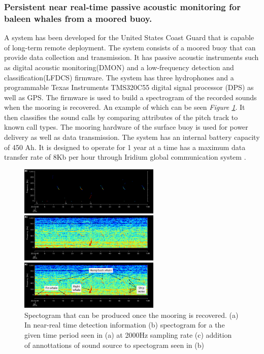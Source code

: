 
\subsubsection{Persistent near real‐time passive acoustic monitoring for baleen whales from a moored buoy.}
A system has been developed for the United States Coast Guard that is capable of long-term remote deployment. 
The system consists of a moored buoy that can provide data collection and transmission.
It has passive acoustic instruments such as digital acoustic monitoring(DMON) and a low-frequency detection and classification(LFDCS) firmware.
The system has three hydrophones and a programmable Texas Instruments TMS320C55 digital signal processor (DPS) as well as GPS.
The firmware is used to build a spectrogram of the recorded sounds when the mooring is recovered.
An example of which can be seen \textit{Figure \ref{fig:SpectoExamp}}.
It then classifies the sound calls by comparing attributes of the pitch track to known call types. 
The mooring hardware of the surface buoy is used for power delivery as well as data transmission. 
The system has an internal battery capacity of 450 Ah. 
It is designed to operate for 1 year at a time has a maximum data transfer rate of 8Kb per hour through Iridium global communication system \cite{baumgartner_persistent_2019}.

\begin{figure}[h]
    \centering
    \includegraphics[width=0.60\textwidth]{graphics/spectogram.png}
    \caption{Spectogram that can be produced once the mooring is recovered.
    (a) In near-real time detection information (b) spectogram for a the given time period seen in (a) at 2000Hz sampling rate (c) addition of annottations of sound source to spectogram seen in (b)\cite{baumgartner_persistent_2019}}
    \label{fig:SpectoExamp}
\end{figure}


